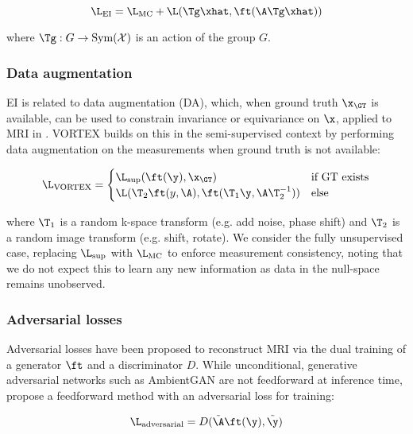 \begin{equation}
    \L_\text{EI}=\L_\text{MC}+\L(\Tg\xhat,\ft(\A\Tg\xhat))
    \label{eq:ei}
\end{equation}

where $\Tg:G\rightarrow\text{Sym}(\mathcal{X})$ is an action of the group $G$.

\subsubsection{Data augmentation}
EI is related to data augmentation (DA), which, when ground truth $\x_\GT$ is available, can be used to constrain invariance or equivariance on $\x$, applied to MRI in \cite{fabian_data_2021}. VORTEX \cite{desai_vortex_2022} builds on this in the semi-supervised context by performing data augmentation on the measurements when ground truth is not available:

\begin{equation}
\L_\text{VORTEX}=
\begin{cases} 
\L_\text{sup}(\ft(\y),\x_\GT) & \text{if GT exists} \\
\L(\T_2\ft(y,\A),\ft(\T_1\y,\A\T_2^{-1})) & \text{else}
\end{cases}
\label{eq:vortex}
\end{equation}

where $\T_1$ is a random k-space transform (e.g. add noise, phase shift) and $\T_2$ is a random image transform (e.g. shift, rotate). We consider the fully unsupervised case, replacing $\L_\text{sup}$ with $\L_\text{MC}$ to enforce measurement consistency, noting that we do not expect this to learn any new information as data in the null-space remains unobserved. 

\subsubsection{Adversarial losses}
Adversarial losses have been proposed to reconstruct MRI via the dual training of a generator $\ft$ and a discriminator $D$. While unconditional, generative adversarial networks such as AmbientGAN \cite{bora_ambientgan_2018} are not feedforward at inference time, \cite{cole_fast_2021} propose a feedforward method with an adversarial loss for training:

\begin{equation}
    \L_\text{adversarial}=D(\tilde\A\ft(\y),\tilde\y)
    \label{eq:cole}
\end{equation}

